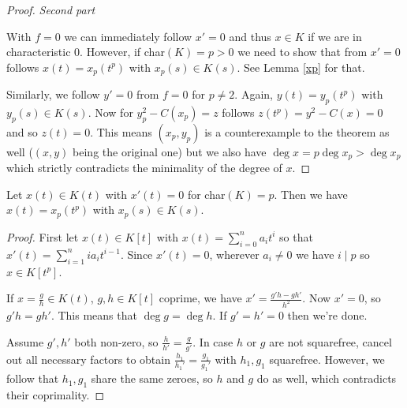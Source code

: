 \documentclass[english,11pt,a4paper]{article}
\begin{document}
\begin{theorem}
\begin{proof}
    \textit{Second part}

    With $f = 0$ we can immediately follow $x' = 0$ and thus $x \in K$ if we are in characteristic 0. However, if char$(K) = p > 0$ we need to show that from $x' = 0$ follows $x(t) = x_p(t^p)$ with $x_p(s) \in K(s)$. See Lemma \ref{xp} for that.

    Similarly, we follow $y' = 0$ from $f = 0$ for $p \neq 2$. Again, $y(t) = y_p(t^p)$ with $y_p(s) \in K(s)$. Now for $y_p^2 -C(x_p) = z$ follows $z(t^p) = y^2 - C(x) = 0$ and so $z(t) = 0$. This means $(x_p, y_p)$ is a counterexample to the theorem as well ($(x,y)$ being the original one) but we also have $\deg x = p \deg x_p > \deg x_p$ which strictly contradicts the minimality of the degree of $x$.
  \end{proof}
\end{theorem}

\begin{lemma}\label{xp}
  Let $x(t) \in K(t)$ with $x'(t) = 0$ for char$(K) = p$. Then we have $x(t) = x_p(t^p)$ with $x_p(s) \in K(s)$.
  \begin{proof}
    \hfill

    First let $x(t) \in K[t]$ with $x(t)= \sum_{i=0}^n a_i t^i$ so that $x'(t)= \sum_{i=1}^n i a_i t^{i-1}$. Since $x'(t) = 0$, wherever $a_i \neq 0$ we have $i \mid p$ so $x \in K[t^p]$.

    If $x = \frac g h \in K(t)$, $g, h \in K[t]$ coprime, we have $x' = \frac{g' h - g h'}{h^2}$. Now $x' = 0$, so $g'h = gh'$. This means that $\deg g = \deg h$. If $g' = h' = 0$ then we're done.%

    Assume $g', h'$ both non-zero, so $\frac{h}{h'} = \frac{g}{g'}$. In case $h$ or $g$ are not squarefree, cancel out all necessary factors to obtain $\frac{h_1}{h_1'} = \frac{g_1}{g_1'}$ with $h_1, g_1$ squarefree. However, we follow that $h_1, g_1$ share the same zeroes, so $h$ and $g$ do as well, which contradicts their coprimality.
  \end{proof}
\end{lemma}
\end{document}
